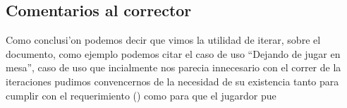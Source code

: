 \subsection{Comentarios al corrector}

Como conclusi'on podemos decir que vimos la utilidad de 
iterar, sobre el documento, como ejemplo podemos citar
el caso de uso ``Dejando de jugar en mesa'', caso de uso 
que incialmente nos parecia innecesario con el correr
de la iteraciones pudimos convencernos de la necesidad de su existencia
tanto para cumplir con el requerimiento () como para 
que el jugardor pue


% 
% 
% 
